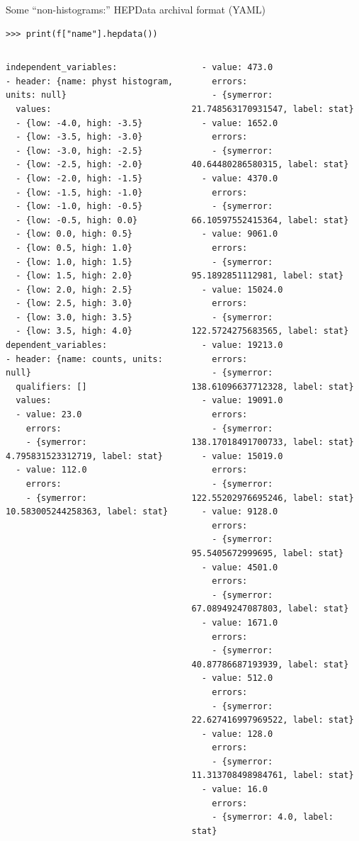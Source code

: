 \documentclass[aspectratio=169]{beamer}
\begin{document}
\begin{frame}[fragile]{Some ``non-histograms:'' HEPData archival format (YAML)}
\small
\begin{verbatim}
>>> print(f["name"].hepdata())
\end{verbatim}

\tiny
\vspace{-0.6 cm}
\begin{columns}[t]
\begin{verbatim}
independent_variables:
- header: {name: physt histogram, units: null}
  values:
  - {low: -4.0, high: -3.5}
  - {low: -3.5, high: -3.0}
  - {low: -3.0, high: -2.5}
  - {low: -2.5, high: -2.0}
  - {low: -2.0, high: -1.5}
  - {low: -1.5, high: -1.0}
  - {low: -1.0, high: -0.5}
  - {low: -0.5, high: 0.0}
  - {low: 0.0, high: 0.5}
  - {low: 0.5, high: 1.0}
  - {low: 1.0, high: 1.5}
  - {low: 1.5, high: 2.0}
  - {low: 2.0, high: 2.5}
  - {low: 2.5, high: 3.0}
  - {low: 3.0, high: 3.5}
  - {low: 3.5, high: 4.0}
dependent_variables:
- header: {name: counts, units: null}
  qualifiers: []
  values:
  - value: 23.0
    errors:
    - {symerror: 4.795831523312719, label: stat}
  - value: 112.0
    errors:
    - {symerror: 10.583005244258363, label: stat}
\end{verbatim}
\begin{verbatim}
  - value: 473.0
    errors:
    - {symerror: 21.748563170931547, label: stat}
  - value: 1652.0
    errors:
    - {symerror: 40.64480286580315, label: stat}
  - value: 4370.0
    errors:
    - {symerror: 66.10597552415364, label: stat}
  - value: 9061.0
    errors:
    - {symerror: 95.1892851112981, label: stat}
  - value: 15024.0
    errors:
    - {symerror: 122.5724275683565, label: stat}
  - value: 19213.0
    errors:
    - {symerror: 138.61096637712328, label: stat}
  - value: 19091.0
    errors:
    - {symerror: 138.17018491700733, label: stat}
  - value: 15019.0
    errors:
    - {symerror: 122.55202976695246, label: stat}
  - value: 9128.0
    errors:
    - {symerror: 95.5405672999695, label: stat}
  - value: 4501.0
    errors:
    - {symerror: 67.08949247087803, label: stat}
  - value: 1671.0
    errors:
    - {symerror: 40.87786687193939, label: stat}
  - value: 512.0
    errors:
    - {symerror: 22.627416997969522, label: stat}
  - value: 128.0
    errors:
    - {symerror: 11.313708498984761, label: stat}
  - value: 16.0
    errors:
    - {symerror: 4.0, label: stat}
\end{verbatim}
\end{columns}
\end{frame}
\end{document}
